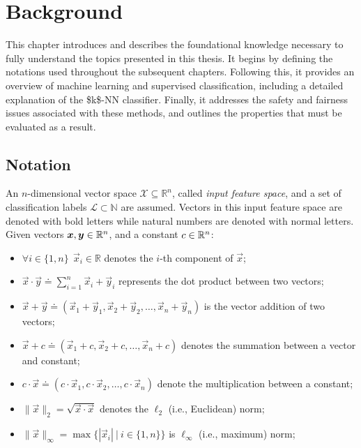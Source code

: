 
\chapter{Background}
\label{chp:background}

This chapter introduces and describes the foundational knowledge necessary to fully understand the topics presented in this thesis. It begins by defining the notations used throughout the subsequent chapters. Following this, it provides an overview of machine learning and supervised classification, including a detailed explanation of the \acs{$k$-NN} classifier. Finally, it addresses the safety and fairness issues associated with these methods, and outlines the properties that must be evaluated as a result.


\section{Notation}
\label{sec:notation}

An $n$-dimensional vector space $\mathcal{X} \subseteq \mathbb{R}^n$, called \textit{input feature space}, and a set of classification labels $\mathcal{L} \subset \mathbb{N}$ are assumed. Vectors in this input feature space are denoted with bold letters while natural numbers are denoted with normal letters. Given vectors $\vec{x}, \vec{y} \in \R[n]$, and a constant $c \in \R$:

\begin{itemize}
  \item $\forall i \in \{1, n\}\ \ \vec{x}_i \in \mathbb{R}$ denotes the $i$-th component of $\vec{x}$;
  \item $\vec{x} \cdot \vec{y} \doteq \sum_{i=1}^n \vec{x}_i + \vec{y}_i$ represents the dot product between two vectors;
  \item $\vec{x} + \vec{y} \doteq (\vec{x}_1 + \vec{y}_1, \vec{x}_2 + \vec{y}_2, \ldots,\vec{x}_n + \vec{y}_n)$ is the vector addition of two vectors;
  \item $\vec{x} + c \doteq (\vec{x}_1 + c, \vec{x}_2 + c, \ldots,\vec{x}_n + c)$ denotes the summation between a vector and constant;
  \item $c\cdot \vec{x} \doteq (c\cdot\vec{x}_1, c\cdot\vec{x}_2, \ldots,c\cdot\vec{x}_n)$ denote the multiplication between a constant;
  \item $\lVert \vec{x} \rVert_2 = \sqrt{\vec{x} \cdot \vec{x}}$ denotes the $\ell_2$ (i.e., Euclidean) norm;
  \item $\lVert \vec{x} \rVert_\infty = \max\{|\vec{x}_i| ~|~ i \in \{1, n\}\}$ is $\ell_\infty$ (i.e., maximum) norm;
\end{itemize}

